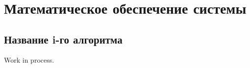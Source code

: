 \section{Математическое обеспечение системы}

\subsection{Название i-го алгоритма}

Work in process.

\clearpage
\newpage